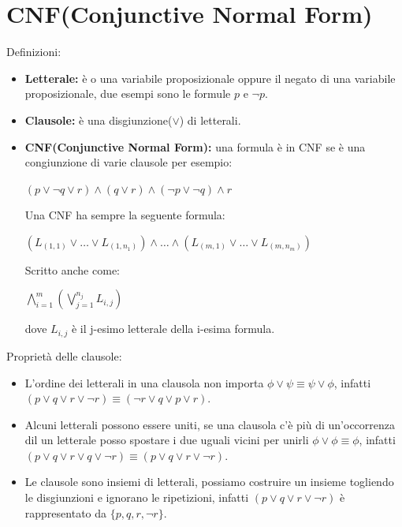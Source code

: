 \documentclass[../main.tex]{subfiles}
\begin{document}
    \section{CNF(Conjunctive Normal Form)}
    Definizioni:
    \begin{itemize}
        \item \textbf{Letterale:} è o una variabile proposizionale oppure il negato di una variabile proposizionale, due esempi sono le formule $p$ e $\lnot p$.
        \item \textbf{Clausole:} è una disgiunzione($\lor$) di letterali.
        \item \textbf{CNF(Conjunctive Normal Form):} una formula è in CNF se è una congiunzione di varie clausole per esempio: 
            \begin{center}
                $(p \lor \lnot q \lor r) \land (q \lor r) \land (\lnot p \lor \lnot q) \land r$ 
            \end{center}
            Una CNF ha sempre la seguente formula:
            \begin{center}
                $(L_{(1,1)} \lor \dots \lor L_{(1,n_1)})\land \dots \land (L_{(m,1)} \lor \dots \lor L_{(m,n_m)})$
            \end{center}
            Scritto anche come:
            \begin{center}
                $\bigwedge^{m}_{i=1} (\bigvee^{n_j}_{j=1} L_{i,j})$
            \end{center}
            dove $L_{i,j}$ è il j-esimo letterale della i-esima formula.
    \end{itemize}
    Proprietà delle clausole:
    \begin{itemize}
        \item L'ordine dei letterali in una clausola non importa $\phi \lor \psi \equiv \psi \lor \phi$, infatti $(p \lor q \lor r \lor \lnot r ) \equiv (\lnot r \lor q \lor p \lor r)$.
        \item Alcuni letterali possono essere uniti, se una clausola c'è più di un'occorrenza dil un letterale posso spostare i due uguali vicini per unirli $\phi \lor \phi \equiv \phi$, infatti $(p \lor q \lor r \lor q \lor \lnot r ) \equiv (p \lor q \lor r \lor \lnot r )$.
        \item Le clausole sono insiemi di letterali, possiamo costruire un insieme togliendo le disgiunzioni e ignorano le ripetizioni, infatti $(p \lor q \lor r \lor \lnot r)$ è rappresentato da $\{p, q, r, \lnot r\}$.
    \end{itemize}
\end{document}
